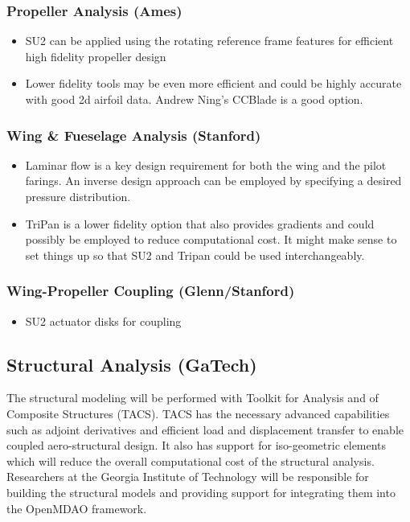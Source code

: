 \documentclass[]{aiaa-tc}
\begin{document}
    \subsubsection{Propeller Analysis (Ames)}
        \begin{itemize}
            \item SU2 can be applied using the rotating reference frame features for efficient high fidelity propeller design
            \item Lower fidelity tools may be even more efficient and could be highly accurate with good 2d airfoil data. Andrew Ning's 
            CCBlade is a good option. 
        \end{itemize}

    \subsubsection{Wing \& Fueselage Analysis (Stanford)}
        \begin{itemize}
            \item Laminar flow is a key design requirement for both the wing and the pilot farings. An inverse design approach can be employed 
            by specifying a desired pressure distribution. 
            \item TriPan is a lower fidelity option that also provides gradients and could possibly be employed to reduce computational cost. It might make sense to set things up so that SU2 and Tripan could be used interchangeably. 
        \end{itemize}

    \subsubsection{Wing-Propeller Coupling (Glenn/Stanford)}
        \begin{itemize}
            \item SU2 actuator disks for coupling
        \end{itemize}

    \subsection{Structural Analysis (GaTech)}

    The structural modeling will be performed with Toolkit for Analysis and of Composite 
    Structures (TACS). TACS has the necessary advanced capabilities such as adjoint derivatives 
    and efficient load and displacement transfer to enable coupled aero­-structural design. It also has 
    support for iso-geometric elements which will reduce the overall computational cost of the 
    structural analysis. Researchers at the Georgia Institute of Technology will be responsible for 
    building the structural models and providing support for integrating them into the OpenMDAO framework. 
\end{document}
